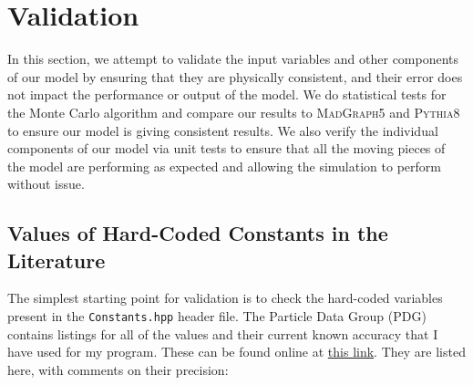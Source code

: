 \section{Validation}\label{sec:6-verification-validation}

In this section, we attempt to validate the input variables and other components of our model by ensuring that they are physically consistent, and their error does not impact the performance or output of the model. We do statistical tests for the Monte Carlo algorithm and compare our results to \textsc{MadGraph5} and \textsc{Pythia8} to ensure our model is giving consistent results. We also verify the individual components of our model via unit tests to ensure that all the moving pieces of the model are performing as expected and allowing the simulation to perform without issue.


\subsection{Values of Hard-Coded Constants in the Literature}

The simplest starting point for validation is to check the hard-coded variables present in the \texttt{Constants.hpp} header file. The Particle Data Group (PDG)~\cite{PDG} contains listings for all of the values and their current known accuracy that I have used for my program. These can be found online at \href{https://pdg.lbl.gov/}{this link}. They are listed here, with comments on their precision:

